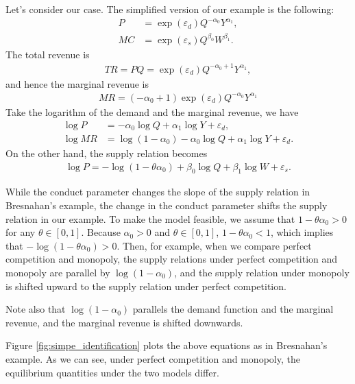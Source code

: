 \documentclass[11pt, a4paper]{article}
\theoremstyle{remark}
\begin{document}
Let's consider our case.
The simplified version of our example is the following:
\begin{align}
    P & = \exp(\varepsilon_{d}) Q^{-\alpha_0} Y^{\alpha_1},\label{eq:simple_demand} \\
    MC & = \exp(\varepsilon_{s}) Q^{\beta_0} W^{\beta_1}. \label{eq:simple_marginal_cost}
\end{align}
The total revenue is
\begin{align}
    TR = PQ = \exp(\varepsilon_{d}) Q^{-\alpha_0+1} Y^{\alpha_1},
\end{align}
and hence the marginal revenue is
\begin{align}
    MR = (-\alpha_0+1)\exp(\varepsilon_{d}) Q^{-\alpha_0} Y^{\alpha_1}
\end{align}
Take the logarithm of the demand and the marginal revenue, we have
\begin{align}
    \log P & = -\alpha_0 \log Q + \alpha_1 \log Y + \varepsilon_d,\\
    \log MR& = \log (1 -\alpha_0) -\alpha_0 \log Q + \alpha_1 \log Y + \varepsilon_d.
\end{align}
On the other hand, the supply relation becomes
\begin{align}
    \log P = -\log (1 - \theta \alpha_0) + \beta_0 \log Q + \beta_1 \log W + \varepsilon_s. \label{eq:simple_supply}
\end{align}

While the conduct parameter changes the slope of the supply relation in Bresnahan's example, the change in the conduct parameter shifts the supply relation in our example.
To make the model feasible, we assume that $1- \theta \alpha_0 >0$ for any $\theta \in [0,1]$.
Because $\alpha_0>0$ and $\theta \in [0,1]$, $1- \theta\alpha_0 <1$, which implies that $- \log(1- \theta\alpha_0) > 0$.
Then, for example, when we compare perfect competition and monopoly,  the supply relations under perfect competition and monopoly are parallel by $\log(1 - \alpha_0)$, and the supply relation under monopoly is shifted upward to the supply relation under perfect competition.

Note also that $\log (1 - \alpha_0)$ parallels the demand function and the marginal revenue, and the marginal revenue is shifted downwards.

Figure \ref{fig:simpe_identification} plots the above equations as in Bresnahan's example.
As we can see, under perfect competition and monopoly, the equilibrium quantities under the two models differ.
\end{document}
